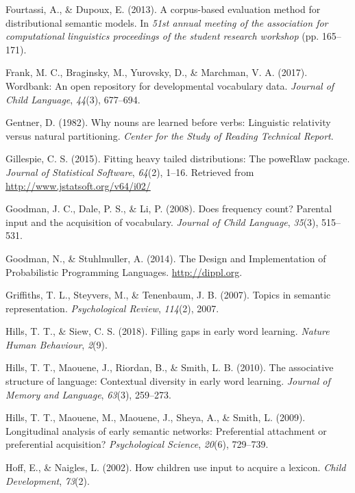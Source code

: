 \documentclass[english,floatsintext,man]{apa6}
\theoremstyle{definition}
\theoremstyle{definition}
\theoremstyle{definition}
\theoremstyle{remark}
\begin{document}
\hypertarget{ref-fourtassi2013}{}
Fourtassi, A., \& Dupoux, E. (2013). A corpus-based evaluation method
for distributional semantic models. In \emph{51st annual meeting of the
association for computational linguistics proceedings of the student
research workshop} (pp. 165--171).

\hypertarget{ref-frank2017}{}
Frank, M. C., Braginsky, M., Yurovsky, D., \& Marchman, V. A. (2017).
Wordbank: An open repository for developmental vocabulary data.
\emph{Journal of Child Language}, \emph{44}(3), 677--694.

\hypertarget{ref-gentner1982}{}
Gentner, D. (1982). Why nouns are learned before verbs: Linguistic
relativity versus natural partitioning. \emph{Center for the Study of
Reading Technical Report}.

\hypertarget{ref-gillespie15}{}
Gillespie, C. S. (2015). Fitting heavy tailed distributions: The
poweRlaw package. \emph{Journal of Statistical Software}, \emph{64}(2),
1--16. Retrieved from \url{http://www.jstatsoft.org/v64/i02/}

\hypertarget{ref-goodman2008}{}
Goodman, J. C., Dale, P. S., \& Li, P. (2008). Does frequency count?
Parental input and the acquisition of vocabulary. \emph{Journal of Child
Language}, \emph{35}(3), 515--531.

\hypertarget{ref-dippl}{}
Goodman, N., \& Stuhlmuller, A. (2014). The Design and Implementation of
Probabilistic Programming Languages. \url{http://dippl.org}.

\hypertarget{ref-griffiths07}{}
Griffiths, T. L., Steyvers, M., \& Tenenbaum, J. B. (2007). Topics in
semantic representation. \emph{Psychological Review}, \emph{114}(2),
2007.

\hypertarget{ref-hills2018}{}
Hills, T. T., \& Siew, C. S. (2018). Filling gaps in early word
learning. \emph{Nature Human Behaviour}, \emph{2}(9).

\hypertarget{ref-hills2010}{}
Hills, T. T., Maouene, J., Riordan, B., \& Smith, L. B. (2010). The
associative structure of language: Contextual diversity in early word
learning. \emph{Journal of Memory and Language}, \emph{63}(3), 259--273.

\hypertarget{ref-hills2009}{}
Hills, T. T., Maouene, M., Maouene, J., Sheya, A., \& Smith, L. (2009).
Longitudinal analysis of early semantic networks: Preferential
attachment or preferential acquisition? \emph{Psychological Science},
\emph{20}(6), 729--739.

\hypertarget{ref-hoff2002}{}
Hoff, E., \& Naigles, L. (2002). How children use input to acquire a
lexicon. \emph{Child Development}, \emph{73}(2).
\end{document}
